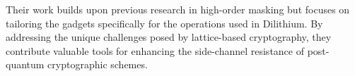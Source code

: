 Their work builds upon previous research in high-order masking but focuses on tailoring the gadgets specifically for the operations used in Dilithium. By addressing the unique challenges posed by lattice-based cryptography, they contribute valuable tools for enhancing the side-channel resistance of post-quantum cryptographic schemes.

